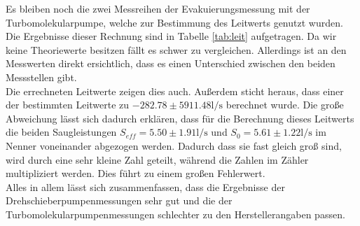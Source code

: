 \noindent
Es bleiben noch die zwei Messreihen der Evakuierungsmessung mit der Turbomolekularpumpe, welche zur Bestimmung des Leitwerts genutzt wurden.
Die Ergebnisse dieser Rechnung sind in Tabelle \ref{tab:leit} aufgetragen.
Da wir keine Theoriewerte besitzen fällt es schwer zu vergleichen. Allerdings ist an den Messwerten direkt ersichtlich, dass es einen Unterschied zwischen den beiden Messstellen gibt.\\
Die errechneten Leitwerte zeigen dies auch. 
Außerdem sticht heraus, dass einer der bestimmten Leitwerte zu $-282.78 \pm 5911.48 \si{\litre\per\second}$ berechnet wurde. 
Die große Abweichung lässt sich dadurch erklären, dass für die Berechnung dieses Leitwerts die beiden Saugleistungen $S_{eff} = 5.50 \pm 1.91 \si{\litre\per\second}$ und $S_0 = 5.61 \pm 1.22 \si{\litre\per\second}$ im Nenner voneinander abgezogen werden.
Dadurch dass sie fast gleich groß sind, wird durch eine sehr kleine Zahl geteilt, während die Zahlen im Zähler multipliziert werden.
Dies führt zu einem großen Fehlerwert.\\
Alles in allem lässt sich zusammenfassen, dass die Ergebnisse der Drehschieberpumpenmessungen sehr gut und die der Turbomolekularpumpenmessungen schlechter zu den Herstellerangaben passen.
\newpage